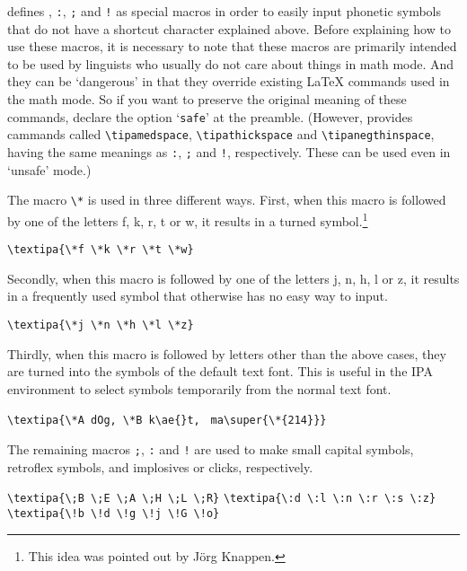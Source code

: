 \tipa{} defines {\tt\tbs*}, {\tt\tbs:}, {\tt\tbs;} and {\tt\tbs!} as
special macros in order to easily input phonetic symbols that do not
have a shortcut character explained above.  Before explaining how to
use these macros, it is necessary to note that these macros are
primarily intended to be used by linguists who usually do not care
about things in math mode. And they can be `dangerous' in that they
override existing \LaTeX{} commands used in the math mode. So if you
want to preserve the original meaning of these commands, declare the
option `\texttt{safe}' at the preamble.
(However, \tipa{} provides cammands called \verb|\tipamedspace|,
\verb|\tipathickspace| and \verb|\tipanegthinspace|, having the same
meanings as {\tt\tbs:}, {\tt\tbs;} and {\tt\tbs!}, respectively. These
can be used even in `unsafe' mode.)


The macro \verb|\*| is used in three different ways.  First, when this
macro is followed by one of the letters f, k, r, t or w, it results in
a turned symbol.\footnote{This idea was pointed out by J\"org
  Knappen.}

\begin{tipaexample}
  \yitem \verb|\textipa{\*f \*k \*r \*t \*w}|
  \yitem {}
\end{tipaexample}

Secondly, when this macro is followed by one of the letters j, n, h,
l or z, it results in a frequently used symbol that otherwise has no
easy way to input.

\begin{tipaexample}
  \yitem \verb|\textipa{\*j \*n \*h \*l \*z}|
  \yitem {}
\end{tipaexample}

Thirdly, when this macro is followed by letters other than the above
cases, they are turned into the symbols of the default text font. This
is useful in the IPA environment to select symbols temporarily from
the normal text font.

\begin{tipaexample}
  \yitem \verb|\textipa{\*A dOg, \*B k\ae{}t, |
    \verb|ma\super{\*{214}}}|
  \yitem {}
\end{tipaexample}

The remaining macros {\tt\tbs;}, {\tt\tbs:} and {\tt\tbs!} are
used to make small capital symbols, retroflex symbols, and implosives
or clicks, respectively.

\begin{tipaexample}
  \yitem \verb|\textipa{\;B \;E \;A \;H \;L \;R}|
  \yitem {}
  \yitem \verb|\textipa{\:d \:l \:n \:r \:s \:z}|
  \yitem {}
  \yitem \verb|\textipa{\!b \!d \!g \!j \!G \!o}|
  \yitem {}
\end{tipaexample}

